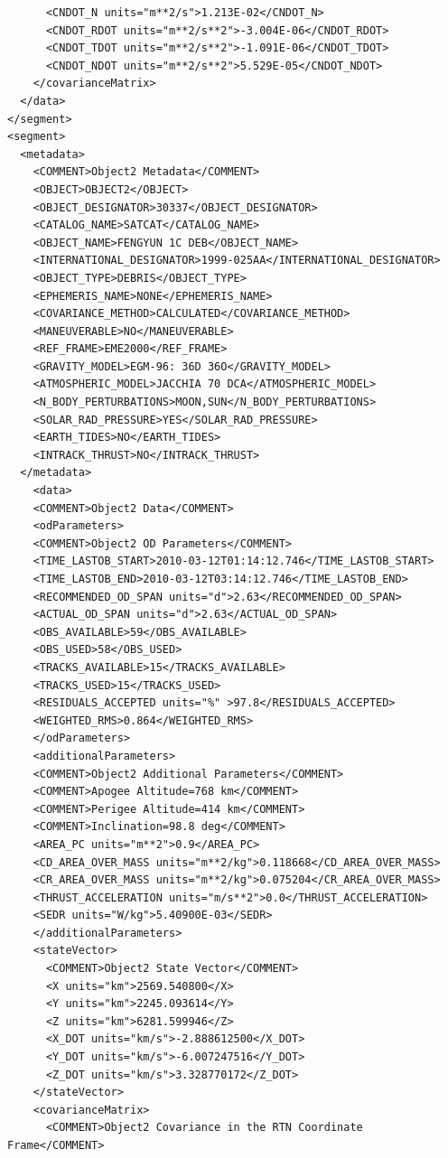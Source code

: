 \begin{lstlisting}
      <CNDOT_N units="m**2/s">1.213E-02</CNDOT_N>
      <CNDOT_RDOT units="m**2/s**2">-3.004E-06</CNDOT_RDOT>
      <CNDOT_TDOT units="m**2/s**2">-1.091E-06</CNDOT_TDOT>
      <CNDOT_NDOT units="m**2/s**2">5.529E-05</CNDOT_NDOT>
    </covarianceMatrix>
  </data>
</segment>
<segment>
  <metadata>
    <COMMENT>Object2 Metadata</COMMENT>
    <OBJECT>OBJECT2</OBJECT>
    <OBJECT_DESIGNATOR>30337</OBJECT_DESIGNATOR>
    <CATALOG_NAME>SATCAT</CATALOG_NAME>
    <OBJECT_NAME>FENGYUN 1C DEB</OBJECT_NAME>
    <INTERNATIONAL_DESIGNATOR>1999-025AA</INTERNATIONAL_DESIGNATOR>
    <OBJECT_TYPE>DEBRIS</OBJECT_TYPE>
    <EPHEMERIS_NAME>NONE</EPHEMERIS_NAME>
    <COVARIANCE_METHOD>CALCULATED</COVARIANCE_METHOD>
    <MANEUVERABLE>NO</MANEUVERABLE>
    <REF_FRAME>EME2000</REF_FRAME>
    <GRAVITY_MODEL>EGM-96: 36D 36O</GRAVITY_MODEL>
    <ATMOSPHERIC_MODEL>JACCHIA 70 DCA</ATMOSPHERIC_MODEL>
    <N_BODY_PERTURBATIONS>MOON,SUN</N_BODY_PERTURBATIONS>
    <SOLAR_RAD_PRESSURE>YES</SOLAR_RAD_PRESSURE>
    <EARTH_TIDES>NO</EARTH_TIDES>
    <INTRACK_THRUST>NO</INTRACK_THRUST>
  </metadata>
    <data>
    <COMMENT>Object2 Data</COMMENT>
    <odParameters>
    <COMMENT>Object2 OD Parameters</COMMENT>
    <TIME_LASTOB_START>2010-03-12T01:14:12.746</TIME_LASTOB_START>
    <TIME_LASTOB_END>2010-03-12T03:14:12.746</TIME_LASTOB_END>
    <RECOMMENDED_OD_SPAN units="d">2.63</RECOMMENDED_OD_SPAN>
    <ACTUAL_OD_SPAN units="d">2.63</ACTUAL_OD_SPAN>
    <OBS_AVAILABLE>59</OBS_AVAILABLE>
    <OBS_USED>58</OBS_USED>
    <TRACKS_AVAILABLE>15</TRACKS_AVAILABLE>
    <TRACKS_USED>15</TRACKS_USED>
    <RESIDUALS_ACCEPTED units="%" >97.8</RESIDUALS_ACCEPTED>
    <WEIGHTED_RMS>0.864</WEIGHTED_RMS>
    </odParameters>
    <additionalParameters>
    <COMMENT>Object2 Additional Parameters</COMMENT>
    <COMMENT>Apogee Altitude=768 km</COMMENT>
    <COMMENT>Perigee Altitude=414 km</COMMENT>
    <COMMENT>Inclination=98.8 deg</COMMENT>
    <AREA_PC units="m**2">0.9</AREA_PC>
    <CD_AREA_OVER_MASS units="m**2/kg">0.118668</CD_AREA_OVER_MASS>
    <CR_AREA_OVER_MASS units="m**2/kg">0.075204</CR_AREA_OVER_MASS>
    <THRUST_ACCELERATION units="m/s**2">0.0</THRUST_ACCELERATION>
    <SEDR units="W/kg">5.40900E-03</SEDR>
    </additionalParameters>
    <stateVector>
      <COMMENT>Object2 State Vector</COMMENT>
      <X units="km">2569.540800</X>
      <Y units="km">2245.093614</Y>
      <Z units="km">6281.599946</Z>
      <X_DOT units="km/s">-2.888612500</X_DOT>
      <Y_DOT units="km/s">-6.007247516</Y_DOT>
      <Z_DOT units="km/s">3.328770172</Z_DOT>
    </stateVector>
    <covarianceMatrix>
      <COMMENT>Object2 Covariance in the RTN Coordinate Frame</COMMENT>

\end{lstlisting}
